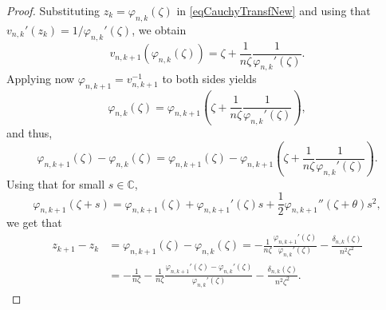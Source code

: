 \documentclass[reqno,11pt]{amsart}
\theoremstyle{plain}
\theoremstyle{definition}
\theoremstyle{remark}
\numberwithin{equation}{section}
\numberwithin{equation}{section}
\newcommand{\C}{\mathbb{C}}
\begin{document}
\begin{proof}
Substituting $z_k=\varphi_{n, k}(\zeta)$ in \eqref{eqCauchyTransfNew} and using that $ v_{n, k}'(z_k)=1/ \varphi_{n, k}'(\zeta)$, we obtain
$$
v_{n, k+1}\left( \varphi_{n, k}(\zeta) \right)
=\zeta +\frac{1}{n \zeta} \frac{1}{\varphi_{n, k}'(\zeta) }.
$$
Applying now $\varphi_{n, k+1}=v_{n, k+1}^{-1}$ to both sides yields
$$
\varphi_{n, k}(\zeta) =\varphi_{n, k+1}\left( \zeta +\frac{1}{n \zeta} \frac{1}{\varphi_{n, k}'(\zeta) }\right),
$$
and thus,
\begin{equation}
    \label{firstidentityPhi1}
\varphi_{n, k+1}(\zeta)- \varphi_{n, k}(\zeta) =  \varphi_{n, k+1}(\zeta) - \varphi_{n, k+1}\left( \zeta +\frac{1}{n \zeta} \frac{1}{\varphi_{n, k}'(\zeta) }\right).
\end{equation}
Using that for small $s\in \C$,
\begin{equation}
    \label{taylorEx}
 \varphi_{n, k+1}\left( \zeta +s\right)= \varphi_{n, k+1}\left( \zeta \right)+ \varphi_{n, k+1}'\left( \zeta \right) s + \frac{1}{2}\varphi_{n, k+1}''\left( \zeta +\theta \right) s^2,
\end{equation}
we get that 
\begin{equation}
    \label{identityPhi1}
    \begin{split}    
  z_{k+1}-z_k & =   \varphi_{n, k+1}(\zeta)- \varphi_{n, k}(\zeta)  =  -\frac{1}{n \zeta} \frac{\varphi_{n, k+1}'\left( \zeta \right)}{\varphi_{n, k}'(\zeta) }-\frac{\delta_{n, k}(\zeta)}{n^2 \zeta^2} \\
&  = -\frac{1}{n \zeta} -\frac{1}{n \zeta} \frac{\varphi_{n, k+1}'\left( \zeta \right)-\varphi_{n, k}'\left( \zeta \right)}{\varphi_{n, k}'(\zeta) }-\frac{\delta_{n, k}(\zeta)}{n^2 \zeta^2}. 
\end{split}
\end{equation}


\end{proof}
\end{document}
